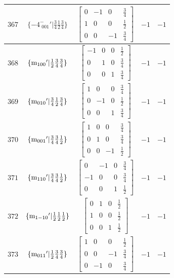 \documentclass[fleqn,8pt]{jsarticle}
\begin{document}
\begin{longtable}{ccccc}
$ 367 $ & $ \{-4^{-}_{\,\,001}{}'|\frac{3}{4} \frac{1}{2} \frac{3}{4}\} $ & $ \begin{bmatrix} 0 & -1 & 0 & \frac{3}{4} \\ 1 & 0 & 0 & \frac{1}{2} \\ 0 & 0 & -1 & \frac{3}{4} \end{bmatrix} $ & $ -1 $ & $ -1 $ \\ \hline
$ 368 $ & $ \{{\rm m}_{100}{}'|\frac{1}{2} \frac{3}{4} \frac{3}{4}\} $ & $ \begin{bmatrix} -1 & 0 & 0 & \frac{1}{2} \\ 0 & 1 & 0 & \frac{3}{4} \\ 0 & 0 & 1 & \frac{3}{4} \end{bmatrix} $ & $ -1 $ & $ -1 $ \\ \hline
$ 369 $ & $ \{{\rm m}_{010}{}'|\frac{3}{4} \frac{1}{2} \frac{3}{4}\} $ & $ \begin{bmatrix} 1 & 0 & 0 & \frac{3}{4} \\ 0 & -1 & 0 & \frac{1}{2} \\ 0 & 0 & 1 & \frac{3}{4} \end{bmatrix} $ & $ -1 $ & $ -1 $ \\ \hline
$ 370 $ & $ \{{\rm m}_{001}{}'|\frac{3}{4} \frac{3}{4} \frac{1}{2}\} $ & $ \begin{bmatrix} 1 & 0 & 0 & \frac{3}{4} \\ 0 & 1 & 0 & \frac{3}{4} \\ 0 & 0 & -1 & \frac{1}{2} \end{bmatrix} $ & $ -1 $ & $ -1 $ \\ \hline
$ 371 $ & $ \{{\rm m}_{110}{}'|\frac{3}{4} \frac{3}{4} \frac{1}{2}\} $ & $ \begin{bmatrix} 0 & -1 & 0 & \frac{3}{4} \\ -1 & 0 & 0 & \frac{3}{4} \\ 0 & 0 & 1 & \frac{1}{2} \end{bmatrix} $ & $ -1 $ & $ -1 $ \\ \hline
$ 372 $ & $ \{{\rm m}_{1-10}{}'|\frac{1}{2} \frac{1}{2} \frac{1}{2}\} $ & $ \begin{bmatrix} 0 & 1 & 0 & \frac{1}{2} \\ 1 & 0 & 0 & \frac{1}{2} \\ 0 & 0 & 1 & \frac{1}{2} \end{bmatrix} $ & $ -1 $ & $ -1 $ \\ \hline
$ 373 $ & $ \{{\rm m}_{011}{}'|\frac{1}{2} \frac{3}{4} \frac{3}{4}\} $ & $ \begin{bmatrix} 1 & 0 & 0 & \frac{1}{2} \\ 0 & 0 & -1 & \frac{3}{4} \\ 0 & -1 & 0 & \frac{3}{4} \end{bmatrix} $ & $ -1 $ & $ -1 $ \\ \hline

\end{longtable}
\end{document}
